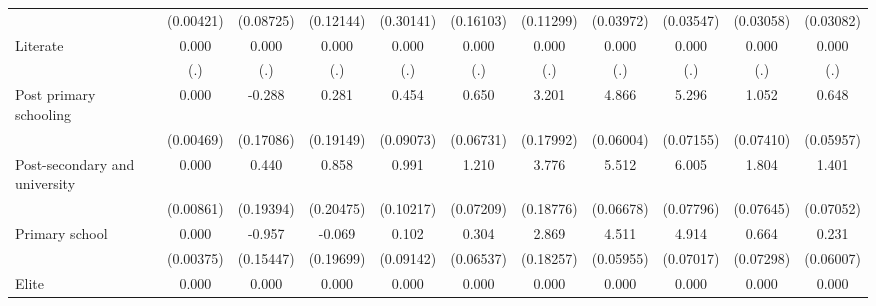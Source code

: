 {\begin{tabular}{l*{10}{c}}
                    &   (0.00421)         &   (0.08725)         &   (0.12144)         &   (0.30141)         &   (0.16103)         &   (0.11299)         &   (0.03972)         &   (0.03547)         &   (0.03058)         &   (0.03082)         \\
Literate            &       0.000         &       0.000         &       0.000         &       0.000         &       0.000         &       0.000         &       0.000         &       0.000         &       0.000         &       0.000         \\
                    &         (.)         &         (.)         &         (.)         &         (.)         &         (.)         &         (.)         &         (.)         &         (.)         &         (.)         &         (.)         \\
Post primary schooling&       0.000         &      -0.288         &       0.281         &       0.454\sym{***}&       0.650\sym{***}&       3.201\sym{***}&       4.866\sym{***}&       5.296\sym{***}&       1.052\sym{***}&       0.648\sym{***}\\
                    &   (0.00469)         &   (0.17086)         &   (0.19149)         &   (0.09073)         &   (0.06731)         &   (0.17992)         &   (0.06004)         &   (0.07155)         &   (0.07410)         &   (0.05957)         \\
Post-secondary and university&       0.000         &       0.440\sym{*}  &       0.858\sym{***}&       0.991\sym{***}&       1.210\sym{***}&       3.776\sym{***}&       5.512\sym{***}&       6.005\sym{***}&       1.804\sym{***}&       1.401\sym{***}\\
                    &   (0.00861)         &   (0.19394)         &   (0.20475)         &   (0.10217)         &   (0.07209)         &   (0.18776)         &   (0.06678)         &   (0.07796)         &   (0.07645)         &   (0.07052)         \\
Primary school      &       0.000         &      -0.957\sym{***}&      -0.069         &       0.102         &       0.304\sym{***}&       2.869\sym{***}&       4.511\sym{***}&       4.914\sym{***}&       0.664\sym{***}&       0.231\sym{***}\\
                    &   (0.00375)         &   (0.15447)         &   (0.19699)         &   (0.09142)         &   (0.06537)         &   (0.18257)         &   (0.05955)         &   (0.07017)         &   (0.07298)         &   (0.06007)         \\
Elite               &       0.000         &       0.000         &       0.000         &       0.000         &       0.000         &       0.000         &       0.000         &       0.000         &       0.000         &       0.000         \\

\end{tabular}}
